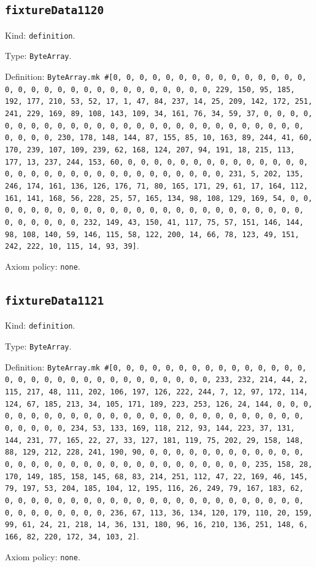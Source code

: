 \documentclass[11pt]{article}
\begin{document}
\subsection*{\texttt{fixtureData1120}}
\noindent Kind: \texttt{definition}.\par
\noindent Type: \texttt{ByteArray}.\par
\noindent Definition: \texttt{ByteArray.mk \#[0, 0, 0, 0, 0, 0, 0, 0, 0, 0, 0, 0, 0, 0, 0, 0, 0, 0, 0, 0, 0, 0, 0, 0, 0, 0, 0, 0, 0, 0, 0, 229, 150, 95, 185, 192, 177, 210, 53, 52, 17, 1, 47, 84, 237, 14, 25, 209, 142, 172, 251, 241, 229, 169, 89, 108, 143, 109, 34, 161, 76, 34, 59, 37, 0, 0, 0, 0, 0, 0, 0, 0, 0, 0, 0, 0, 0, 0, 0, 0, 0, 0, 0, 0, 0, 0, 0, 0, 0, 0, 0, 0, 0, 0, 0, 230, 178, 148, 144, 87, 155, 85, 10, 163, 89, 244, 41, 60, 170, 239, 107, 109, 239, 62, 168, 124, 207, 94, 191, 18, 215, 113, 177, 13, 237, 244, 153, 60, 0, 0, 0, 0, 0, 0, 0, 0, 0, 0, 0, 0, 0, 0, 0, 0, 0, 0, 0, 0, 0, 0, 0, 0, 0, 0, 0, 0, 0, 0, 0, 231, 5, 202, 135, 246, 174, 161, 136, 126, 176, 71, 80, 165, 171, 29, 61, 17, 164, 112, 161, 141, 168, 56, 228, 25, 57, 165, 134, 98, 108, 129, 169, 54, 0, 0, 0, 0, 0, 0, 0, 0, 0, 0, 0, 0, 0, 0, 0, 0, 0, 0, 0, 0, 0, 0, 0, 0, 0, 0, 0, 0, 0, 0, 0, 232, 149, 43, 150, 41, 117, 75, 57, 151, 146, 144, 98, 108, 140, 59, 146, 115, 58, 122, 200, 14, 66, 78, 123, 49, 151, 242, 222, 10, 115, 14, 93, 39]}.\par
\noindent Axiom policy: \texttt{none}.\par
\subsection*{\texttt{fixtureData1121}}
\noindent Kind: \texttt{definition}.\par
\noindent Type: \texttt{ByteArray}.\par
\noindent Definition: \texttt{ByteArray.mk \#[0, 0, 0, 0, 0, 0, 0, 0, 0, 0, 0, 0, 0, 0, 0, 0, 0, 0, 0, 0, 0, 0, 0, 0, 0, 0, 0, 0, 0, 0, 0, 233, 232, 214, 44, 2, 115, 217, 48, 111, 202, 106, 197, 126, 222, 244, 7, 12, 97, 172, 114, 124, 67, 185, 213, 34, 105, 171, 189, 223, 253, 126, 24, 144, 0, 0, 0, 0, 0, 0, 0, 0, 0, 0, 0, 0, 0, 0, 0, 0, 0, 0, 0, 0, 0, 0, 0, 0, 0, 0, 0, 0, 0, 0, 0, 234, 53, 133, 169, 118, 212, 93, 144, 223, 37, 131, 144, 231, 77, 165, 22, 27, 33, 127, 181, 119, 75, 202, 29, 158, 148, 88, 129, 212, 228, 241, 190, 90, 0, 0, 0, 0, 0, 0, 0, 0, 0, 0, 0, 0, 0, 0, 0, 0, 0, 0, 0, 0, 0, 0, 0, 0, 0, 0, 0, 0, 0, 0, 0, 235, 158, 28, 170, 149, 185, 158, 145, 68, 83, 214, 251, 112, 47, 22, 169, 46, 145, 79, 197, 53, 204, 185, 104, 12, 195, 116, 26, 249, 79, 167, 183, 62, 0, 0, 0, 0, 0, 0, 0, 0, 0, 0, 0, 0, 0, 0, 0, 0, 0, 0, 0, 0, 0, 0, 0, 0, 0, 0, 0, 0, 0, 0, 0, 236, 67, 113, 36, 134, 120, 179, 110, 20, 159, 99, 61, 24, 21, 218, 14, 36, 131, 180, 96, 16, 210, 136, 251, 148, 6, 166, 82, 220, 172, 34, 103, 2]}.\par
\noindent Axiom policy: \texttt{none}.\par
\end{document}

